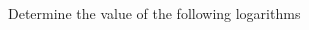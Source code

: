 
\newcommand{\MathsTwoLogsQTwoWkg}[3]{
	\par
	\(
		\log_{#1}{#2}
		\rightarrow
		#1^{n} = #2
	\)
	\par
	$\rightarrow \log_{#1}{#2}=$%
	\colorbox{yellow}{%
		$#3$%
	}
}
\newcommand{\MathsTwoLogsQTwoQs}[3]{
	\(
		\log_{#1}{#2}
	\)
}
\newcommand{\MathsTwoLogsQTwoSols}[3]{
	$#3$
}

\question Determine the value of the following logarithms
\begin{multicols}{4}
\end{multicols}
